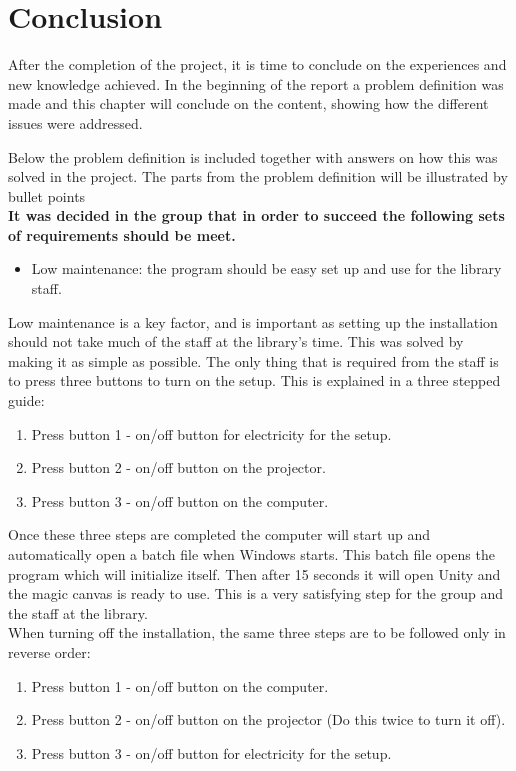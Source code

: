 \chapter{Conclusion}
After the completion of the project, it is time to conclude on the experiences and new knowledge achieved. In the beginning of the report a problem definition was made and this chapter will conclude on the content, showing how the different issues were addressed.

Below the problem definition is included together with answers on how this was solved in the project. The parts from the problem definition will be illustrated by bullet points \\
\textbf{It was decided in the group that in order to succeed the following sets of requirements should be meet.} 

\begin{itemize}
\item Low maintenance: the program should be easy set up and use for the library staff.
\end{itemize}

Low maintenance is a key factor, and is important as setting up the installation should not take much of the staff at the library's time. This was solved by making it as simple as possible. The only thing that is required from the staff is to press three buttons to turn on the setup. This is explained in a three stepped guide:
\begin{enumerate}
\item Press button 1 - on/off button for electricity for the setup.
\item Press button 2 - on/off button on the projector.
\item Press button 3 - on/off button on the computer.
\end{enumerate}

Once these three steps are completed the computer will start up and automatically open a batch file when Windows starts. This batch file opens the program which will initialize itself. Then after 15 seconds it will open Unity and the magic canvas is ready to use. This is a very satisfying step for the group and the staff at the library.\\ 
When turning off the installation, the same three steps are to be followed only in reverse order:
\begin{enumerate}
\item Press button 1 - on/off button on the computer.
\item Press button 2 - on/off button on the projector (Do this twice to turn it off).
\item Press button 3 - on/off button for electricity for the setup.
\end{enumerate}


